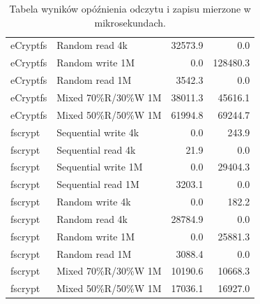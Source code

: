 \documentclass[a4paper]{article}
\begin{document}
\begin{table}[H]
\begin{tabular}{|l|l|r|r|}
        eCryptfs & Random read 4k  & 32573.9 & 0.0 \\
        eCryptfs & Random write 1M  & 0.0 & 128480.3 \\
        eCryptfs & Random read 1M  & 3542.3 & 0.0 \\
        eCryptfs & Mixed 70\%R/30\%W 1M  & 38011.3 & 45616.1 \\
        eCryptfs & Mixed 50\%R/50\%W 1M  & 61994.8 & 69244.7 \\
        fscrypt & Sequential write 4k & 0.0 & 243.9 \\
        fscrypt & Sequential read 4k & 21.9 & 0.0 \\
        fscrypt & Sequential write 1M & 0.0 & 29404.3 \\
        fscrypt & Sequential read 1M & 3203.1 & 0.0 \\
        fscrypt & Random write 4k & 0.0 & 182.2 \\
        fscrypt & Random read 4k & 28784.9 & 0.0 \\
        fscrypt & Random write 1M & 0.0 & 25881.3 \\
        fscrypt & Random read 1M & 3088.4 & 0.0 \\
        fscrypt & Mixed 70\%R/30\%W 1M & 10190.6 & 10668.3 \\
        fscrypt & Mixed 50\%R/50\%W 1M & 17036.1 & 16927.0 \\
        \hline
    \end{tabular}
    \caption{Tabela wyników opóźnienia odczytu i zapisu mierzone w mikrosekundach.}
    \label{tab:fio_latency}
\end{table}
\end{document}
